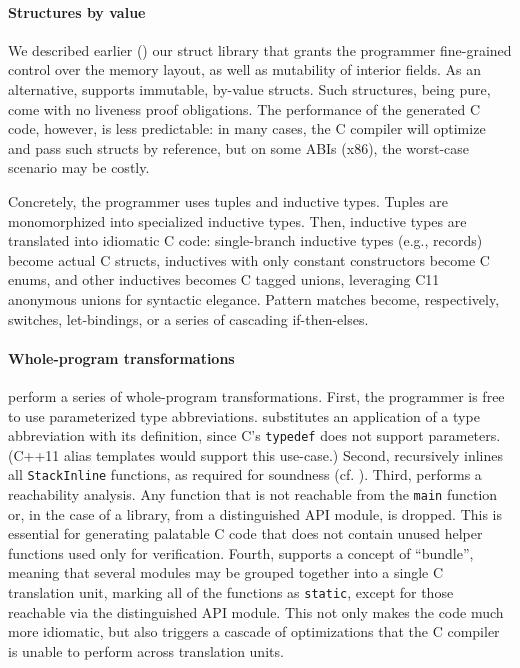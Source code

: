 \documentclass[acmsmall,review,anonymous]{acmart}\settopmatter{printfolios=true}
\let\li\lstinline
\begin{document}
\paragraph{Structures by value}
We described earlier () our \lowstar struct library that grants the
programmer fine-grained control over the memory layout, as well as
mutability of interior fields. As an alternative, \kremlin supports immutable,
by-value structs. Such structures, being pure, come with no liveness proof obligations.
The performance of the generated C code, however, is less
predictable: in many cases, the C compiler will optimize and pass such structs
by reference, but on some ABIs (x86), the worst-case scenario may be costly.

Concretely, the \fstar programmer uses tuples and inductive
types. Tuples are monomorphized into specialized inductive
types. Then, inductive types are translated into idiomatic C code:
single-branch inductive types (e.g., records) become actual C structs,
inductives with only constant constructors become C enums, and other
inductives becomes C tagged unions, leveraging C11 anonymous unions
for syntactic elegance. Pattern matches become, respectively,
switches, let-bindings, or a series of cascading if-then-elses.

\paragraph{Whole-program transformations}
\kremlin perform a series of whole-program transformations. First, the
programmer is free to use parameterized type abbreviations. \kremlin substitutes
an application of a type abbreviation with its definition, since C's \li+typedef+ does
not support parameters. (C++11 alias templates would support this use-case.)
%
Second, \kremlin recursively inlines all \li+StackInline+ functions, as required for
soundness (cf. ).
%
Third, \kremlin performs a reachability analysis. Any function that is not
reachable from the \li+main+ function or, in the case of a library, from a
distinguished API module, is dropped. This is essential for generating
palatable C code that does not contain unused helper functions used only for
verification.
%
Fourth, \kremlin supports a concept of ``bundle'', meaning that several \fstar
modules may be grouped together into a single C translation unit, marking all of
the functions as \li+static+, except for those reachable via the distinguished API
module. This not only makes the code much more idiomatic, but also triggers a
cascade of optimizations that the C compiler is unable to perform across
translation units.
\end{document}
